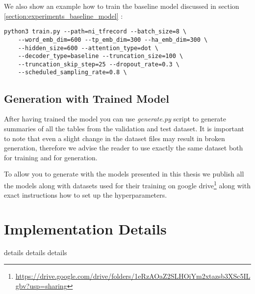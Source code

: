 We also show an example how to train the baseline model discussed in section \ref{section:experiments_baseline_model} :

\begin{verbatim}
python3 train.py --path=ni_tfrecord --batch_size=8 \
    --word_emb_dim=600 --tp_emb_dim=300 --ha_emb_dim=300 \
    --hidden_size=600 --attention_type=dot \
    --decoder_type=baseline --truncation_size=100 \
    --truncation_skip_step=25 --dropout_rate=0.3 \
    --scheduled_sampling_rate=0.8 \
\end{verbatim}

\subsection{Generation with Trained Model}

After having trained the model you can use \emph{generate.py} script to generate summaries of all the tables from the validation and test dataset. It is important to note that even a slight change in the dataset files may result in broken generation, therefore we advise the reader to use exactly the same dataset both for training and for generation.

To allow you to generate with the models presented in this thesis we publish all the models along with datasets used for their training on google drive\footnote{\url{https://drive.google.com/drive/folders/1eRzAOaZ2SLHOiYm2xtazsb3XSc5ILgbv?usp=sharing}} along with exact instructions how to set up the hyperparameters.

\section{Implementation Details}

details details details
